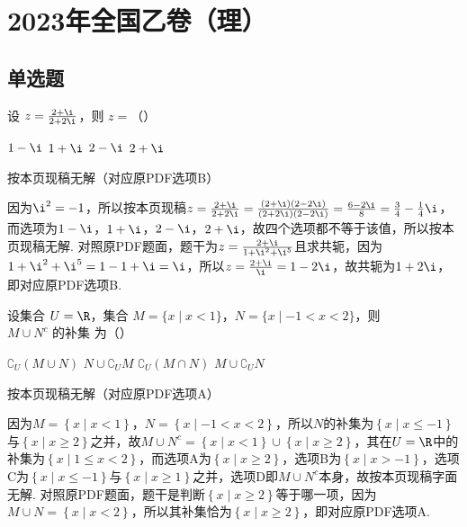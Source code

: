 \chapter{2023年全国乙卷（理）}

\section{单选题}

\begin{problem}
设 \(z=\frac{2+\i}{2+2\i}\)，则 \(z=\)（\quad）

\choices
    {\(1-\i\)}
    {\(1+\i\)}
    {\(2-\i\)}
    {\(2+\i\)}
\end{problem}

\begin{answer}
按本页现稿无解（对应原PDF选项B）
\end{answer}

\begin{solution}
因为\(\i^{2}=-1\)，所以按本页现稿\(z=\frac{2+\i}{2+2\i}=\frac{\left(2+\i\right)\left(2-2\i\right)}{\left(2+2\i\right)\left(2-2\i\right)}=\frac{6-2\i}{8}=\frac{3}{4}-\frac{1}{4}\i\)，而选项为\(1-\i\)，\(1+\i\)，\(2-\i\)，\(2+\i\)，故四个选项都不等于该值，所以按本页现稿无解. 对照原PDF题面，题干为\(z=\frac{2+\i}{1+\i^{2}+\i^{5}}\)且求共轭，因为\(1+\i^{2}+\i^{5}=1-1+\i=\i\)，所以\(z=\frac{2+\i}{\i}=1-2\i\)，故共轭为\(1+2\i\)，即对应原PDF选项B.
\end{solution}

\begin{problem}
设集合 \(U=\R\)，集合 \(M=\{x\mid x<1\}\)，\(N=\{x\mid -1<x<2\}\)，则 \(M\cup N^c\text{ 的补集}\) 为（\quad）

\choices
    {\(\complement_U(M\cup N)\)}
    {\(N\cup\complement_U M\)}
    {\(\complement_U(M\cap N)\)}
    {\(M\cup\complement_U N\)}
\end{problem}

\begin{answer}
按本页现稿无解（对应原PDF选项A）
\end{answer}

\begin{solution}
因为\(M=\left\{x\mid x<1\right\}\)，\(N=\left\{x\mid -1<x<2\right\}\)，所以\(N\)的补集为\(\left\{x\mid x\le -1\right\}\)与\(\left\{x\mid x\ge 2\right\}\)之并，故\(M\cup N^{c}=\left\{x\mid x<1\right\}\cup\left\{x\mid x\ge 2\right\}\)，其在\(U=\R\)中的补集为\(\left\{x\mid 1\le x<2\right\}\)，而选项A为\(\left\{x\mid x\ge 2\right\}\)，选项B为\(\left\{x\mid x>-1\right\}\)，选项C为\(\left\{x\mid x\le -1\right\}\)与\(\left\{x\mid x\ge 1\right\}\)之并，选项D即\(M\cup N^{c}\)本身，故按本页现稿字面无解. 对照原PDF题面，题干是判断\(\left\{x\mid x\ge 2\right\}\)等于哪一项，因为\(M\cup N=\left\{x\mid x<2\right\}\)，所以其补集恰为\(\left\{x\mid x\ge 2\right\}\)，即对应原PDF选项A.
\end{solution}

